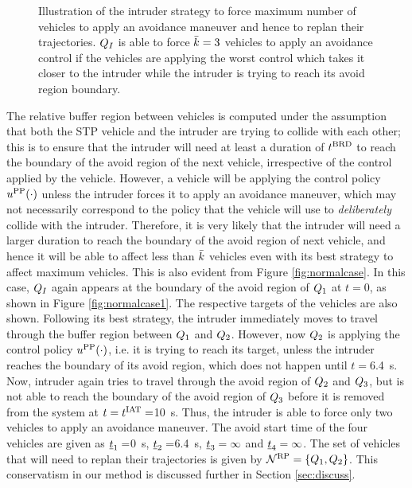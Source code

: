 \begin{figure}
\begin{subfigure}{.5\columnwidth}
  \subcaption{}
  \label{fig:worstcase4}
\end{subfigure}
\caption{Illustration of the intruder strategy to force maximum number of vehicles to apply an avoidance maneuver and hence to replan their trajectories. $Q_{I}$ is able to force $\bar{k}=3$ vehicles to apply an avoidance control if the vehicles are applying the worst control which takes it closer to the intruder while the intruder is trying to reach its avoid region boundary. }
\label{fig:worstcase}
\end{figure}

The relative buffer region between vehicles is computed under the assumption that both the STP vehicle and the intruder are trying to collide with each other; this is to ensure that the intruder will need at least a duration of $t^\text{BRD}$ to reach the boundary of the avoid region of the next vehicle, irrespective of the control applied by the vehicle. However, a vehicle will be applying the control policy $u^{\text{PP}}(\cdot)$ unless the intruder forces it to apply an avoidance maneuver, which may not necessarily correspond to the policy that the vehicle will use to \textit{deliberately} collide with the intruder. Therefore, it is very likely that the intruder will need a larger duration to reach the boundary of the avoid region of next vehicle, and hence it will be able to affect less than $\bar{k}$ vehicles even with its best strategy to affect maximum vehicles. This is also evident from Figure \ref{fig:normalcase}. In this case, $Q_{I}$ again appears at the boundary of the avoid region of $Q_1$ at $t=0$, as shown in Figure \ref{fig:normalcase1}. The respective targets of the vehicles are also shown. Following its best strategy, the intruder immediately moves to travel through the buffer region between $Q_1$ and $Q_2$. However, now $Q_2$ is applying the control policy $u^{\text{PP}}(\cdot)$, i.e. it is trying to reach its target, unless the intruder reaches the boundary of its avoid region, which does not happen until $t= $\SI{6.4}{\s}. Now, intruder again tries to travel through the avoid region of $Q_2$ and $Q_3$, but is not able to reach the boundary of the avoid region of $Q_3$ before it is removed from the system at $t=t^\text{IAT}=$\SI{10}{\s}. Thus, the intruder is able to force only two vehicles to apply an avoidance maneuver. The avoid start time of the four vehicles are given as $\underline{t}_1 = $\SI{0}{\s}, $\underline{t}_2 = $\SI{6.4}{\s}, $\underline{t}_3 = \infty$ and $\underline{t}_4 = \infty$. The set of vehicles that will need to replan their trajectories is given by $\mathcal{N}^\text{RP} = \{Q_1, Q_2\}$. This conservatism in our method is discussed further in Section \ref{sec:discuss}.

